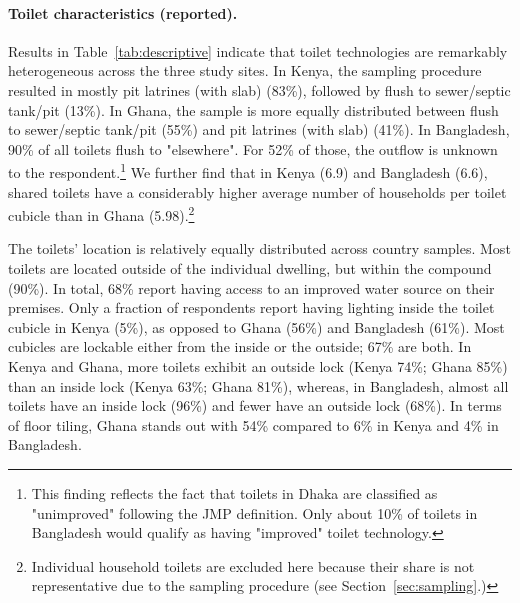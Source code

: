 \documentclass[natbib]{svjour3}                     %
\begin{document}

\FloatBarrier
\paragraph{Toilet characteristics (reported).}
Results in Table~\ref{tab:descriptive} indicate that toilet technologies are remarkably heterogeneous across the three study sites. In Kenya, the sampling procedure resulted in mostly pit latrines (with slab) (83\%), followed by flush to sewer/septic tank/pit (13\%). In Ghana, the sample is more equally distributed between flush to sewer/septic tank/pit (55\%) and pit latrines (with slab) (41\%). In Bangladesh, 90\% of all toilets flush to "elsewhere". For 52\% of those, the outflow is unknown to the respondent.\footnote{This finding reflects the fact that toilets in Dhaka are classified as "unimproved" following the JMP definition. Only about 10\% of toilets in Bangladesh would qualify as having "improved" toilet technology.} We further find that in Kenya (6.9) and Bangladesh (6.6), shared toilets have a considerably higher average number of households per toilet cubicle than in Ghana (5.98).\footnote{Individual household toilets are excluded here because their share is not representative due to the sampling procedure (see Section~\ref{sec:sampling}.)}



The toilets' location is relatively equally distributed across country samples. Most toilets are located outside of the individual dwelling, but within the compound (90\%). In total, 68\% report having access to an improved water source on their premises. Only a fraction of respondents report having lighting inside the toilet cubicle in Kenya (5\%), as opposed to Ghana (56\%) and Bangladesh (61\%). Most cubicles are lockable either from the inside or the outside; 67\% are both. In Kenya and Ghana, more toilets exhibit an outside lock (Kenya 74\%; Ghana 85\%) than an inside lock (Kenya 63\%; Ghana 81\%), whereas, in Bangladesh, almost all toilets have an inside lock (96\%) and fewer have an outside lock (68\%). In terms of floor tiling, Ghana stands out with 54\% compared to 6\% in Kenya and 4\% in Bangladesh. 
\end{document}
